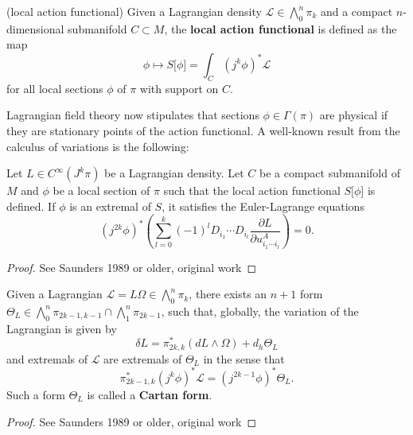 \begin{definition}{(local action functional)}
  Given a Lagrangian density $\mathcal L \in \bigwedge^n_0\pi_k$ and a compact $n$-dimensional submanifold $C \subset M$, the \textbf{local action functional} is defined as the map
  \begin{equation}
    \phi \mapsto S\lbrack\phi\rbrack = \int_C (j^k\phi)^\ast\mathcal L
  \end{equation}
for all local sections $\phi$ of $\pi$ with support on $C$.
\end{definition}

Lagrangian field theory now stipulates that sections $\phi\in\Gamma(\pi)$ are physical if they are stationary points of the action functional. A well-known result from the calculus of variations is the following:
\begin{proposition}
  Let $L\in C^\infty(J^k\pi)$ be a Lagrangian density. Let $C$ be a compact submanifold of $M$ and $\phi$ be a local section of $\pi$ such that the local action functional $S\lbrack\phi\rbrack$ is defined. If $\phi$ is an extremal of $S$, it satisfies the Euler-Lagrange equations
  \begin{equation}\label{euler_lagrange_local}
    (j^{2k}\phi)^\ast\left( \sum_{l=0}^{k} (-1)^l D_{i_1} \cdots D_{i_l} \frac{\partial L}{\partial u^A_{i_1\cdots i_l}}\right) = 0.
  \end{equation}
\end{proposition}
\begin{proof}
  See Saunders 1989 or older, original work
\end{proof}

\begin{proposition}
  Given a Lagrangian $\mathcal L = L\Omega \in \bigwedge^n_0\pi_k$, there exists an $n+1$ form $\Theta_L\in\bigwedge^{n}_0\pi_{2k-1,k-1}\cap\bigwedge^{n}_{1}\pi_{2k-1}$, such that, globally, the variation of the Lagrangian is given by
  \begin{equation}\label{global_lagrange_form}
    \delta L = \pi^\ast_{2k,k} \left( dL\wedge\Omega\right) + d_h \Theta_L
  \end{equation}
  and extremals of $\mathcal L$ are extremals of $\Theta_L$ in the sense that
  \begin{equation}
    \pi_{2k-1,k}^\ast (j^k\phi)^\ast\mathcal L = (j^{2k-1}\phi)^\ast\Theta_L.
  \end{equation}
  Such a form $\Theta_L$ is called a \textbf{Cartan form}.
\end{proposition}
\begin{proof}
  See Saunders 1989 or older, original work
\end{proof}

